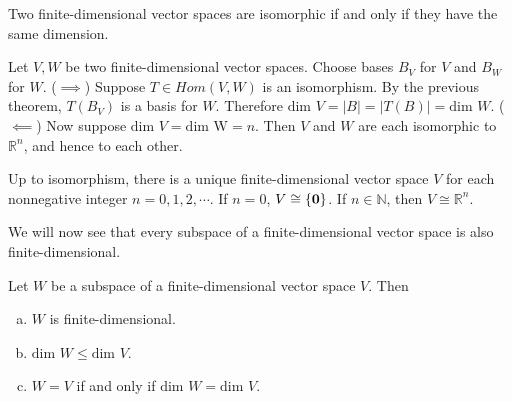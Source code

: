 \documentclass[12pt,letterpaper,reqno]{article}
\numberwithin{equation}{section}
\begin{document}
\begin{thm}
	Two finite-dimensional vector spaces are isomorphic if and only if they have the same dimension.
\end{thm}

\begin{pf}
	Let $V, W$ be two finite-dimensional vector spaces. Choose bases $B_V$ for $V$ and $B_W$ for $W$. ($\implies$) Suppose $T \in Hom(V,W)$ is an isomorphism. By the previous theorem, $T(B_V)$ is a basis for $W$. Therefore 
	$\text{dim }V=|B|=|T(B)|=\text{dim }W$. ($\impliedby$) Now suppose $\text{dim }V=\text{dim W}=n$. Then $V$ and $W$ are each isomorphic to $\mathbb{R}^n$, and hence to each other. 
\end{pf}

\begin{cor}
	Up to isomorphism, there is a unique finite-dimensional vector space $V$ for each nonnegative integer $n=0,1,2,\cdots$. If $n=0$, $V \cong \{{\bf 0}\}$. If $n \in \mathbb{N}$, then $V \cong \mathbb{R}^n$.
\end{cor}

We will now see that every subspace of a finite-dimensional vector space is also finite-dimensional.

\begin{thm}
	Let $W$ be a subspace of a finite-dimensional vector space $V$. Then
	\begin{enumerate}[(a)]
		\item $W$ is finite-dimensional.
		\item $\text{dim }W \leq \text{dim }V$.
		\item $W=V$ if and only if $\text{dim }W=\text{dim }V$.
	\end{enumerate}
\end{thm}
\end{document}
